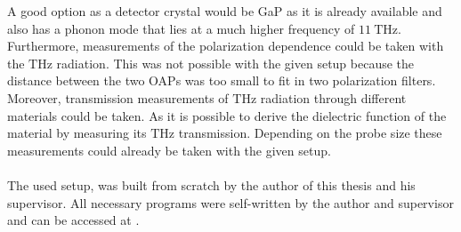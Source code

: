 A good option as a detector crystal would be GaP as it is already available and also has a phonon mode that lies at a much higher frequency of $\SI{11}{\tera\hertz}$.
\\
Furthermore, measurements of the polarization dependence could be taken with the $\si{\tera\hertz}$ radiation.
This was not possible with the given setup because the distance between the two OAPs was too small to fit in two polarization filters.
Moreover, transmission measurements of $\si{\tera\hertz}$ radiation through different materials could be taken.
As it is possible to derive the dielectric function of the material by measuring its $\si{\tera\hertz}$ transmission.
Depending on the probe size these measurements could already be taken with the given setup.
\\\\
The used setup, was built from scratch by the author of this thesis and his supervisor.
All necessary programs were self-written by the author and supervisor and can be accessed at \cite{github}.